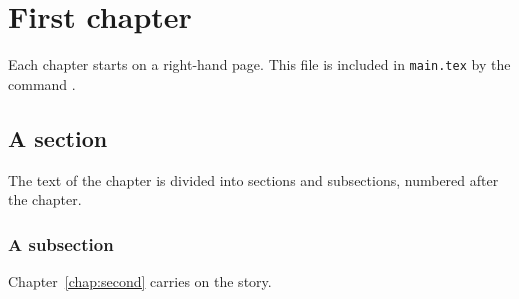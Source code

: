 \chapter{First chapter}
\label{chap:first}

Each chapter starts on a right-hand page. This file is included in
\texttt{main.tex} by the command \verb||.

\section{A section}

The text of the chapter is divided into sections and subsections, numbered
after the chapter.

\subsection{A subsection}

Chapter~\ref{chap:second} carries on the story.
